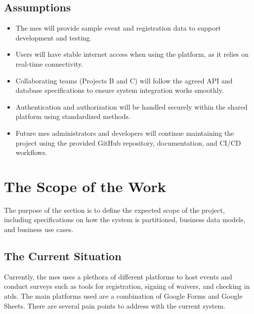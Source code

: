 \documentclass[12pt]{article}
\begin{document}
\subsection{Assumptions}

\begin{itemize}
    \item The \gls{mes} will provide sample event and registration data to support development and testing.
    \item Users will have stable internet access when using the platform, as it relies on real-time connectivity.
    \item Collaborating teams (Projects B and C) will follow the agreed API and database specifications to ensure system
      integration works smoothly.
    \item Authentication and authorization will be handled securely within the shared platform using standardized
      methods.
    \item Future \gls{mes} administrators and developers will continue maintaining the project using the provided GitHub
      repository, documentation, and CI/CD workflows.
\end{itemize}

\section{The Scope of the Work}

The purpose of the section is to define the expected scope of the project, including specifications on how the system is
partitioned, business data models, and business use cases.

\subsection{The Current Situation}

Currently, the \gls{mes} uses a plethora of different platforms to host events and conduct surveys such as tools for
registration, signing of waivers, and checking in \glspl{atd}. The main platforms used are a combination of Google Forms
and Google Sheets. There are several pain points to address with the current system.
\end{document}
